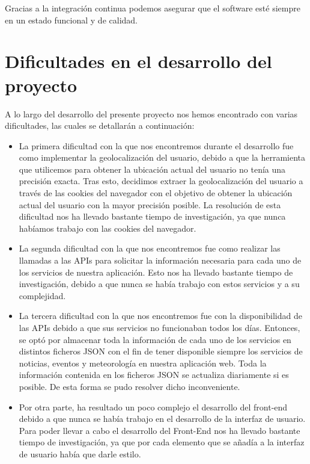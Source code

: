 Gracias a la integración continua podemos asegurar que el software esté siempre en un estado funcional y de calidad.

\section{Dificultades en el desarrollo del proyecto}

A lo largo del desarrollo del presente proyecto nos hemos encontrado con varias dificultades, las cuales se detallarán a continuación:

\begin{itemize}
    \item La primera dificultad con la que nos encontremos durante el desarrollo fue como implementar la geolocalización del usuario, debido a que la herramienta que utilicemos para obtener la ubicación actual del usuario no tenía una precisión exacta. Tras esto, decidimos extraer la geolocalización del usuario a través de las cookies del navegador con el objetivo de obtener la ubicación actual del usuario con la mayor precisión posible. La resolución de esta dificultad nos ha llevado bastante tiempo de investigación, ya que nunca habíamos trabajo con las cookies del navegador.

    \item La segunda dificultad con la que nos encontremos fue como realizar las llamadas a las APIs para solicitar la información necesaria para cada uno de los servicios de nuestra aplicación. Esto nos ha llevado bastante tiempo de investigación, debido a que nunca se había trabajo con estos servicios y a su complejidad.

    \item La tercera dificultad con la que nos encontremos fue con la disponibilidad de las APIs debido a que sus servicios no funcionaban todos los días. Entonces, se optó por almacenar toda la información de cada uno de los servicios en distintos ficheros JSON con el fin de tener disponible siempre los servicios de noticias, eventos y meteorología en nuestra aplicación web. Toda la información contenida en los ficheros JSON se actualiza diariamente si es posible. De esta forma se pudo resolver dicho inconveniente. 

    \item Por otra parte, ha resultado un poco complejo el desarrollo del front-end debido a que nunca se había trabajo en el desarrollo de la interfaz de usuario.  Para poder llevar a cabo el desarrollo del Front-End nos ha llevado bastante tiempo de investigación, ya que por cada elemento que se añadía a la interfaz de usuario había que darle estilo.
    
\end{itemize}


